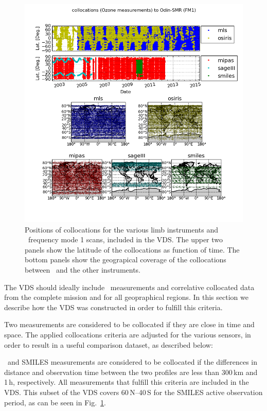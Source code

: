 \begin{figure}[t]
\centering
\includegraphics[width=17cm]{test_collocation_fm1.png}
\caption{Positions of collocations for the various limb instruments
and \smr\ frequency mode 1 scans, included in the VDS. The upper two panels show
the latitude of the collocations as function of time. The bottom panels
show the geograpical coverage of the collocations between \smr\
and the other instruments.}
\label{fig:vdsfm1}
\end{figure}


The VDS should ideally include \smr\ measurements and correlative collocated 
data from the complete mission and for all geopraphical regions.
In this section we describe how the VDS was constructed
in order to fulfill this criteria.

Two measurements are considered to be collocated if they
are close in time and space. The applied collocations
criteria are adjusted for the various sensors, in order
to result in a useful comparison dataset, as described below:

\smr\ and SMILES measurements are considered to be collocated if the 
differences in distance and observation time between the two profiles are
less than 300\,km and 1\,h, respectively.
All measurements that fulfill this criteria are included
in the VDS. This subset of the VDS
covers 60\degree\,N--40\degree\,S for the SMILES
active observation period, as can be seen in Fig.~\ref{fig:vdsfm1}.

